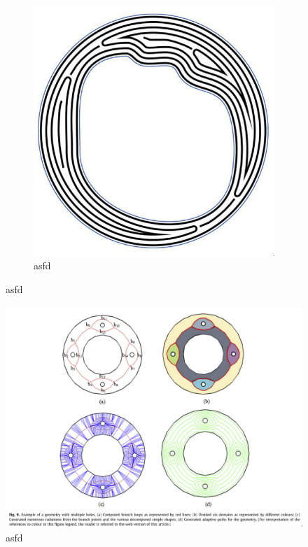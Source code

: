 \begin{figure}
\begin{subfigure}{0.45\columnwidth}
\includegraphics[width=\columnwidth]{sources/related_work/jin.jpg}
\caption{asfd}
\label{jin}
\end{subfigure}
\end{figure}

\begin{figure}
\includegraphics[width=\columnwidth]{sources/related_work/ding.jpg}
\caption{asfd}
\label{ding}
\end{figure}